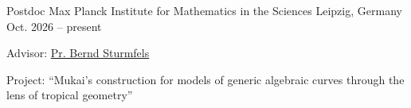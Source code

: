 
\begin{cventries}
	
	\cventry
	{Postdoc} %
	{Max Planck Institute for Mathematics in the Sciences} %
	{Leipzig, Germany} %
	{Oct. 2026 -- present} %
	{\begin{cvitems}
			\item Advisor: \href{https://math.berkeley.edu/~bernd/}{Pr. Bernd Sturmfels}
			\item Project: ``Mukai's construction for models of generic algebraic curves through the lens of tropical geometry''
		\end{cvitems}}
\end{cventries}